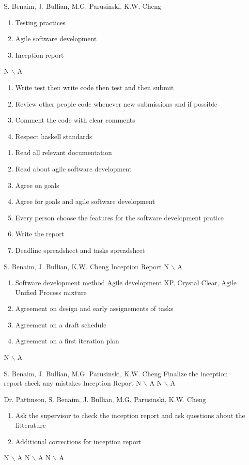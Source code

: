 %
{S. Benaim, J. Bullian, M.G. Parusinski, K.W. Cheng}%
{ \begin{enumerate} 
\item Testing practices
\item Agile software development
\item Inception report
\end{enumerate} }%
{ N $\backslash$ A}%
{\begin{enumerate}
\item Write test then write code then test and then submit
\item Review other people code whenever new submissions and if possible
\item Comment the code with clear comments
\item Respect haskell standards
\end{enumerate}}
{ \begin{enumerate}
\item Read all relevant documentation
\item Read about agile software development
\item Agree on goals
\item Agree for goals and agile software development
\item Every person choose the features for the software development pratice
\item Write the report
\item Deadline spreadsheet and tasks spreadsheet
\end{enumerate}}%

%
{S. Benaim, J. Bullian, K.W. Cheng}%
{Inception Report}%
{ N $\backslash$ A}%
{\begin{enumerate}
\item Software development method Agile development XP, Crystal Clear, Agile Unified Process mixture
\item Agreement on design and early assignements of tasks
\item Agreement on a draft schedule
\item Agreement on a first iteration plan
\end{enumerate}}
{N $\backslash$ A}%

%
{S. Benaim, J. Bullian, M.G. Parusinski, K.W. Cheng}%
{Finalize the inception report check any mistakes }%
{Inception Report}%
{N $\backslash$ A}
{N $\backslash$ A}%

%
{Dr. Pattinson, S. Benaim, J. Bullian, M.G. Parusinski, K.W. Cheng}%
{ \begin{enumerate} 
\item Ask the supervisor to check the inception report and ask questions about the litterature
\item Additional corrections for inception report
\end{enumerate} }%
{ N $\backslash$ A}%
{N $\backslash$ A}
{N $\backslash$ A}%

